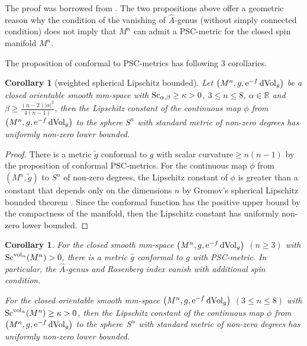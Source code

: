 \documentclass[pdftex]{sigma}
\newtheorem{Corollary}[Theorem]{Corollary}
\begin{document}
\begin{Remark}
 The proof was borrowed from \cite[Proposition~2]{MR3625165}. The two propositions above offer a geometric reason why the condition of the vanishing of $\widehat{A}$-genus (without simply connected condition) does not imply that $M^n$ can admit a PSC-metric for the closed spin manifold $M^n$.
\end{Remark}

The proposition of conformal to PSC-metrics has following 3 corollaries.

\begin{Corollary}[weighted spherical Lipschitz bounded]
Let $\big(M^n, g, {\rm e}^{-f}\,{\rm dVol}_g\big)$ be a closed orientable smooth mm-space with ${\rm Sc}_{\alpha, \beta}\geq \kappa >0$, $3\leq n\leq 8$, $\alpha \in \mathbb{R}$ and $\beta \geq \frac{(n-2)|\alpha|^2}{4(n-1)}$, then the Lipschitz constant of the continuous map $\phi$ from $\big(M^n, g, {\rm e}^{-f}\,{\rm dVol}_g\big)$ to the sphere $S^n$ with standard metric of non-zero degrees has uniformly non-zero lower bounded.
\end{Corollary}

\begin{proof}There is a metric $\tilde{g}$ conformal to $g$ with scalar curvature${}\geq n(n-1)$ by the proposition of conformal PSC-metrics. For the continuous map $\phi$ from $(M^n, \tilde{g})$ to $S^n$ of non-zero degrees, the Lipschitz constant of $\phi$ is greater than a constant that depends only on the dimensions $n$ by Gromov's spherical Lipschitz bounded theorem \cite[Section~3]{MR3816521}. Since the conformal function has the positive upper bound by the compactness of the manifold, then the Lipschitz constant has uniformly non-zero lower bounded.
\end{proof}

\begin{Corollary}\label{weighted volume}
For the closed smooth mm-space $\big(M^n, g, {\rm e}^{-f}\,{\rm dVol}_g\big)$ $(n\geq 3)$ with ${\rm Sc}^{{\rm vol}_n}(M^n) \allowbreak >0$, there is a metric $\hat{g}$ conformal to $g$ with PSC-metric. In particular, the $\widehat{A}$-genus and Rosenberg index vanish with additional spin condition.

For the closed orientable smooth mm-space $\big(M^n, g, {\rm e}^{-f}\,{\rm dVol}_g\big)$ $(3\leq n\leq 8)$ with ${\rm Sc}^{{\rm vol}_n}(M^n)\geq \kappa >0$, then the Lipschitz constant of the continuous map $\phi$ from $\big(M^n, g, {\rm e}^{-f}\,{\rm dVol}_g\big)$ to the sphere~$S^n$ with standard metric of non-zero degrees has uniformly non-zero lower bounded.
\end{Corollary}
\end{document}
